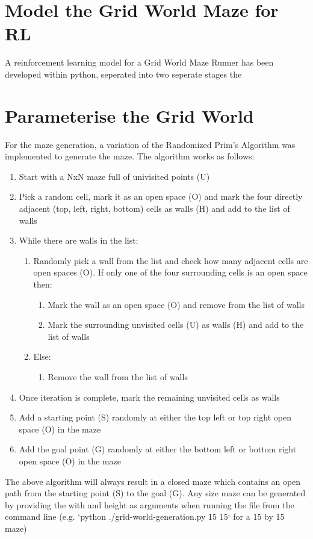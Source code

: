 \documentclass[twoside, 12pt, a4paper]{article}
\begin{document}
\section{Model the Grid World Maze for RL}
A reinforcement learning model for a Grid World Maze Runner has been developed within python, seperated into two seperate stages the 

\section{Parameterise the Grid World}
For the maze generation, a variation of the Randomized Prim’s Algorithm was implemented to generate the maze. The algorithm works as follows:
\begin{enumerate}
\item Start with a NxN maze full of univisited points (U)
\item Pick a random cell, mark it as an open space (O) and mark the four directly adjacent (top, left, right, bottom) cells as walls (H) and add to the list of walls
\item While there are walls in the list:
\begin{enumerate}
\item Randomly pick a wall from the list and check how many adjacent cells are open spaces (O). If only one of the four surrounding cells is an open space then:
\begin{enumerate}
\item Mark the wall as an open space (O) and remove from the list of walls
\item Mark the surrounding unvisited cells (U) as walls (H) and add to the list of walls
\end{enumerate}
\item Else:
\begin{enumerate}
\item Remove the wall from the list of walls
\end{enumerate}
\end{enumerate}
\item Once iteration is complete, mark the remaining unvisited cells as walls
\item Add a starting point (S) randomly at either the top left or top right open space (O) in the maze
\item Add the goal point (G) randomly at either the bottom left or bottom right open space (O) in the maze
\end{enumerate}
The above algorithm will always result in a closed maze which contains an open path from the starting point (S) to the goal (G). Any size maze can be generated by providing the with and height as arguments when running the file from the command line (e.g. `python ./grid-world-generation.py 15 15` for a 15 by 15 maze)
\end{document}
